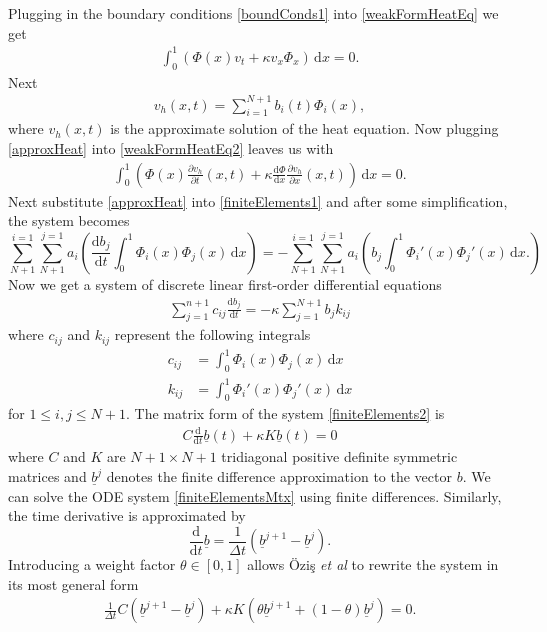 \documentclass[undefended]{sfuthesis}
\begin{document}
Plugging in the boundary conditions \eqref{boundConds1} into \eqref{weakFormHeatEq} we get
\begin{align}
\int_{0}^{1} \left(\Phi(x) v_t + \kappa v_x \Phi_x\right) \,\mathrm{d} x = 0. \label{weakFormHeatEq2}
\end{align}
Next 
\begin{align}
v_h(x, t) = \sum_{i = 1}^{N + 1} b_i(t) \Phi_i(x), \label{approxHeat}
\end{align}
where $v_h(x,t)$ is the approximate solution of the heat equation. Now plugging \eqref{approxHeat} into \eqref{weakFormHeatEq2} leaves us with 
\begin{align}
\int_{0}^{1} \left(\Phi(x) \frac{\partial v_h}{\partial t} (x, t) + \kappa \frac{\mathrm{d} \Phi}{\mathrm{d} x} \frac{\partial v_h}{\partial x}(x, t)\right) \,\mathrm{d} x = 0. \label{finiteElements1}
\end{align}
Next substitute \eqref{approxHeat} into \eqref{finiteElements1} and after some simplification, the system becomes \[\sum_{N + 1}^{i = 1} \sum_{N + 1}^{j = 1}a_i \left( \frac{\mathrm{d} b_j}{\mathrm{d} t} \int_{0}^{1} \Phi_i(x) \Phi_j(x) \,\mathrm{d} x \right) = - \sum_{N + 1}^{i = 1}\sum_{N + 1}^{j = 1} a_i \left(b_j \int_{0}^{1} \Phi_i'(x) \Phi_j'(x) \,\mathrm{d} x.\right)\] Now we get a system of discrete linear first-order differential equations 
\begin{align}
\sum_{j = 1}^{n + 1} c_{ij} \frac{\mathrm{d} b_j}{\mathrm{d} t} = - \kappa \sum_{j = 1}^{N + 1} b_j k_{ij} \label{finiteElements2}
\end{align}
where $c_{ij}$ and $k_{ij}$ represent the following integrals
\begin{align}
	c_{ij} &= \int_{0}^{1} \Phi_i(x) \Phi_j(x) \,\mathrm{d}x \label{cij}\\
	k_{ij} &= \int_{0}^{1} \Phi_i'(x) \Phi_j'(x) \,\mathrm{d}x \label{kij}
\end{align}
for $1 \leq i, j \leq N + 1.$ The matrix form of the system \eqref{finiteElements2} is 
\begin{align}
C \frac{\mathrm{d}}{\mathrm{d} t} \underline{b}(t) + \kappa K \underline{b}(t) = 0 \label{finiteElementsMtx}
\end{align}
where $C$ and $K$ are $N + 1 \times N + 1$ tridiagonal positive definite symmetric matrices and $\underline{b}^j$ denotes the finite difference approximation to the vector $b$. We can solve the ODE system \eqref{finiteElementsMtx} using finite differences. Similarly, the time derivative is approximated by \[\frac{\mathrm{d}}{\mathrm{d} t} \underline{b} = \frac{1}{\Delta t} (\underline{b}^{j + 1} - \underline{b}^j). \] Introducing a weight factor $\theta \in [0, 1]$ allows \"Ozi\c{s} \textit{et al} to rewrite the system in its most general form 
\begin{align}
	\frac{1}{\Delta t} C \left(\underline{b}^{j + 1} - \underline{b}^{j}\right) + \kappa K \left(\theta \underline{b}^{j + 1} + (1 - \theta)\underline{b}^{j}\right) = 0. \label{finiteElementSystem}
\end{align}
\end{document}
